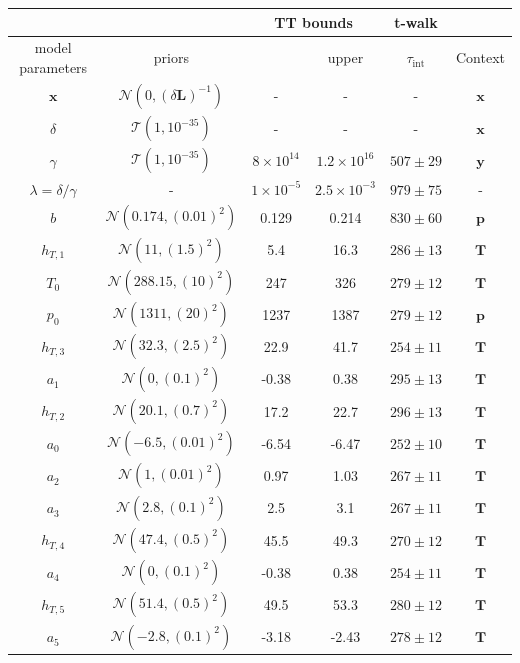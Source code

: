 \begin{table}[ht!]
	\centering
	\begin{tabular}{ |c||c|c|c|c|c|   }
		\hline
		& &\multicolumn{2}{|c|}{TT bounds}& t-walk&\\
		\hline
		model parameters& priors&\makecell{lower}& \makecell{upper\\
		}&$\tau_{\text{int}}$&Context\\
		\hhline{|=||=|=|=|=|=|}
		$\bm{x}$ &$\mathcal{N}(0,(\delta \bm{L})^{-1})$ & -&-&-& $\bm{x}$\\ \hline
		$\delta$ &$\mathcal{T}(1,10^{-35})$ & -&-&  -& $\bm{x}$\\ \hline
		$\gamma$ & $\mathcal{T}(1,10^{-35})$ &$8\times10^{14}$ &$1.2\times10^{16}$&  $ 507\pm 29$ &$\bm{y}$\\ \hline
		$\lambda  = \delta / \gamma$ &- & $1\times10^{-5}$&$2.5\times10^{-3}$& $979 \pm 75$ & -\\ \hline
		$b$ &  $\mathcal{N}(0.174,(0.01)^2)$& 0.129& 0.214 &$830\pm 60$&$\bm{p}$\\ \hline
		$h_{T,1}$ &  $\mathcal{N}(11,(1.5)^2)$&5.4 &16.3&$286\pm 13$ &$\bm{T}$\\ \hline
		$T_{0}$ &  $\mathcal{N}(288.15,(10)^2)$& 247 &326&$279 \pm 12$&$\bm{T}$\\ \hline
		$p_0$ &  $\mathcal{N}(1311,(20)^2)$&1237 &1387&$279\pm 12$&$\bm{p}$\\ \hline
		$h_{T,3}$ &  $\mathcal{N}(32.3,(2.5)^2)$&22.9&41.7&$254\pm 11$&$\bm{T}$\\ \hline
		$a_{1}$ &  $\mathcal{N}(0,(0.1)^2)$&-0.38 &0.38&$295 \pm 13$&$\bm{T}$\\ \hline
		$h_{T,2}$ &  $\mathcal{N}(20.1,(0.7)^2)$&17.2 &22.7&$296\pm 13$&$\bm{T}$\\ \hline
		$a_{0}$ &  $\mathcal{N}(-6.5,(0.01)^2)$&-6.54 &-6.47&$252 \pm 10$&$\bm{T}$\\ \hline
		$a_{2}$ &  $\mathcal{N}(1,(0.01)^2)$&0.97 &1.03&$267 \pm 11$&$\bm{T}$\\ \hline
		$a_{3}$ &  $\mathcal{N}(2.8,(0.1)^2)$&2.5 &3.1&$267\pm 11$&$\bm{T}$\\ \hline
		$h_{T,4}$ &  $\mathcal{N}(47.4,(0.5)^2)$&45.5 &49.3&$270 \pm 12$&$\bm{T}$\\ \hline
		$a_{4}$ &  $\mathcal{N}(0,(0.1)^2)$&-0.38 &0.38&$254 \pm 11$&$\bm{T}$\\ \hline
		$h_{T,5}$ &  $\mathcal{N}(51.4,(0.5)^2)$&49.5 &53.3&$280 \pm 12$&$\bm{T}$\\ \hline
		$a_{5}$ &  $\mathcal{N}(-2.8,(0.1)^2)$&-3.18 &-2.43&$278 \pm 12$&$\bm{T}$\\ \hline

\end{tabular}
\end{table}

